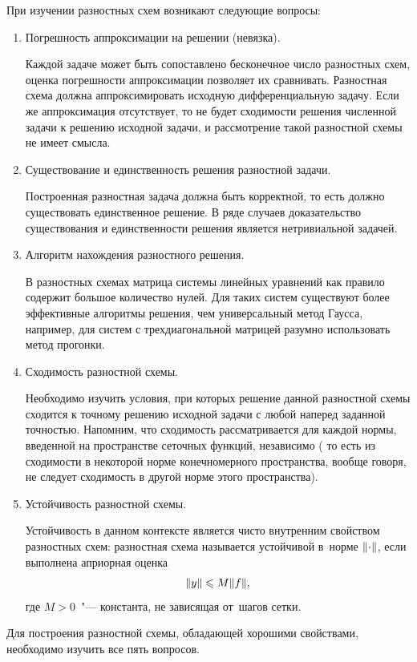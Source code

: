 \documentclass[11pt,a4paper,twoside]{report}
\numberwithin{equation}{section}
\theoremstyle{definition}
\theoremstyle{plain}
\DeclarePairedDelimiter\norm{\lVert}{\rVert}
\begin{document}
При изучении разностных схем возникают следующие вопросы:
\begin{enumerate}
%
    \item
    Погрешность аппроксимации на решении (невязка).
    \label{item:approx}

    Каждой задаче может быть сопоставлено бесконечное число разностных схем,
    оценка погрешности аппроксимации позволяет их сравнивать. Разностная схема
    должна аппроксимировать исходную дифференциальную задачу. Если же аппроксимация
    отсутствует, то не будет сходимости решения численной задачи к решению исходной
    задачи, и рассмотрение такой разностной схемы не имеет смысла.
    \item
    Существование и единственность решения разностной задачи.
    \label{item:existance}

    Построенная разностная задача должна быть корректной, то есть
    должно существовать единственное решение.
    В ряде случаев доказательство существования и единственности решения является
    нетривиальной задачей.
    \item
    Алгоритм нахождения разностного решения.
    \label{item:algorithm}

    В разностных схемах матрица системы линейных уравнений как правило
    содержит большое количество нулей. Для таких систем существуют
    более эффективные алгоритмы решения, чем универсальный метод Гаусса,
    например, для систем с трехдиагональной матрицей разумно использовать
    метод прогонки.
    \item
    Сходимость разностной схемы.
    \label{item:convergence}

    Необходимо изучить условия, при которых решение данной разностной
    схемы сходится к точному решению исходной задачи с любой
    наперед заданной точностью. Напомним, что сходимость рассматривается
    для каждой нормы, введенной на пространстве сеточных функций, независимо (
    то есть из сходимости в некоторой норме конечномерного пространства,
    вообще говоря, не следует сходимость в другой норме этого пространства).
    \item
    Устойчивость разностной схемы.
    \label{item:robustness}

    Устойчивость в данном контексте является чисто внутренним свойством
    разностных схем: разностная схема называется
    устойчивой в~норме $\norm{\cdot}$, если выполнена априорная оценка
    $$
        \norm{y}\leqslant M\norm{f},
    $$
    где $M>0$~"--- константа, не зависящая от~шагов сетки.
%
\end{enumerate}
%
Для построения разностной схемы, обладающей хорошими свойствами,
необходимо изучить все пять вопросов.
\end{document}
